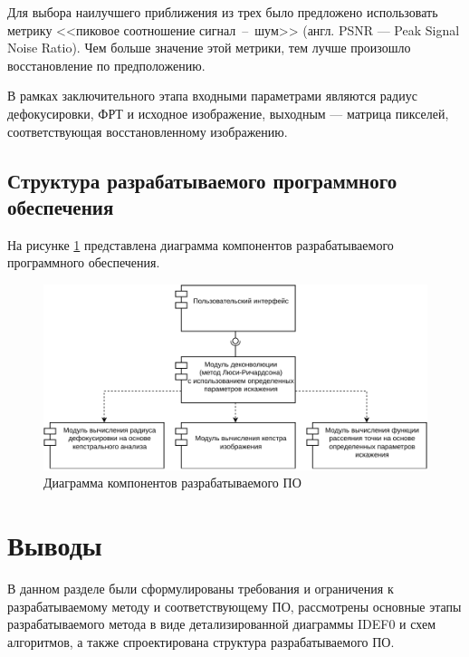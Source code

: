 Для выбора наилучшего приближения из трех было предложено использовать метрику <<пиковое соотношение сигнал~--~шум>> (англ. PSNR --- Peak Signal Noise Ratio). Чем больше значение этой метрики, тем лучше произошло восстановление по предположению.

В рамках заключительного этапа входными параметрами являются радиус дефокусировки, ФРТ и исходное изображение, выходным --- матрица пикселей, соответствующая восстановленному изображению.

\subsection{Структура разрабатываемого программного обеспечения}

На рисунке \ref{struct} представлена диаграмма компонентов разрабатываемого программного обеспечения.

\begin{figure}[H]
	\centering
	\includegraphics[scale=0.9]{assets/structure.pdf}
	\caption{Диаграмма компонентов разрабатываемого ПО}
	\label{struct}
\end{figure}

\section*{Выводы}

В данном разделе были сформулированы требования и ограничения к разрабатываемому методу и соответствующему ПО, рассмотрены основные этапы разрабатываемого метода в виде детализированной диаграммы IDEF0 и схем алгоритмов, а также спроектирована структура разрабатываемого ПО.
